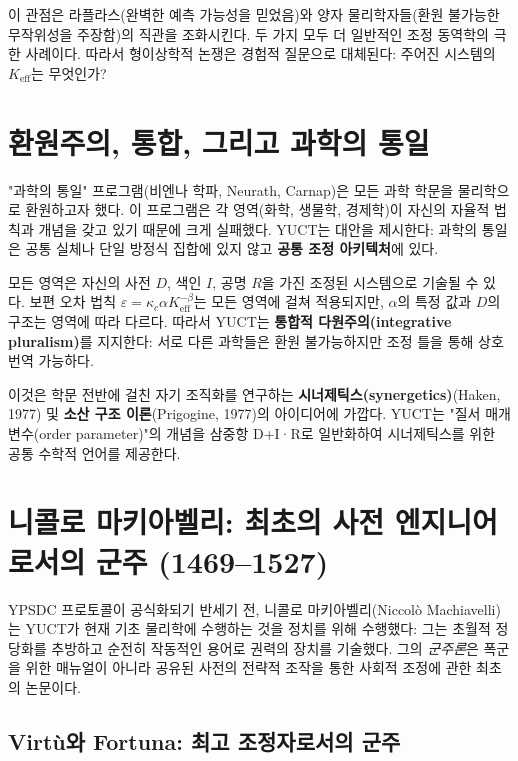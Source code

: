 \documentclass[12pt,a4paper]{article}
\begin{document}
	이 관점은 라플라스(완벽한 예측 가능성을 믿었음)와 양자 물리학자들(환원 불가능한 무작위성을 주장함)의 직관을 조화시킨다. 두 가지 모두 더 일반적인 조정 동역학의 극한 사례이다. 따라서 형이상학적 논쟁은 경험적 질문으로 대체된다: 주어진 시스템의 \(K_{\mathrm{eff}}\)는 무엇인가?
	
	\section{환원주의, 통합, 그리고 과학의 통일}
	
	"과학의 통일" 프로그램(비엔나 학파, Neurath, Carnap)은 모든 과학 학문을 물리학으로 환원하고자 했다. 이 프로그램은 각 영역(화학, 생물학, 경제학)이 자신의 자율적 법칙과 개념을 갖고 있기 때문에 크게 실패했다. YUCT는 대안을 제시한다: 과학의 통일은 공통 실체나 단일 방정식 집합에 있지 않고 \textbf{공통 조정 아키텍처}에 있다.
	
	모든 영역은 자신의 사전 \(D\), 색인 \(I\), 공명 \(R\)을 가진 조정된 시스템으로 기술될 수 있다. 보편 오차 법칙 \(\varepsilon = \kappa_c \alpha K_{\mathrm{eff}}^{-\beta}\)는 모든 영역에 걸쳐 적용되지만, \(\alpha\)의 특정 값과 \(D\)의 구조는 영역에 따라 다르다. 따라서 YUCT는 \textbf{통합적 다원주의(integrative pluralism)}를 지지한다: 서로 다른 과학들은 환원 불가능하지만 조정 틀을 통해 상호 번역 가능하다.
	
	이것은 학문 전반에 걸친 자기 조직화를 연구하는 \textbf{시너제틱스(synergetics)}(Haken, 1977) 및 \textbf{소산 구조 이론}(Prigogine, 1977)의 아이디어에 가깝다. YUCT는 "질서 매개변수(order parameter)"의 개념을 삼중항 D+I·R로 일반화하여 시너제틱스를 위한 공통 수학적 언어를 제공한다.
	
	\section{니콜로 마키아벨리: 최초의 사전 엔지니어로서의 군주 (1469–1527)}
	\label{sec:machiavelli}
	
	YPSDC 프로토콜이 공식화되기 반세기 전, 니콜로 마키아벨리(Niccolò Machiavelli)는 YUCT가 현재 기초 물리학에 수행하는 것을 정치를 위해 수행했다: 그는 초월적 정당화를 추방하고 순전히 작동적인 용어로 권력의 장치를 기술했다. 그의 \emph{군주론}은 폭군을 위한 매뉴얼이 아니라 공유된 사전의 전략적 조작을 통한 사회적 조정에 관한 최초의 논문이다.
	
	\subsection{Virtù와 Fortuna: 최고 조정자로서의 군주}
	
\end{document}
